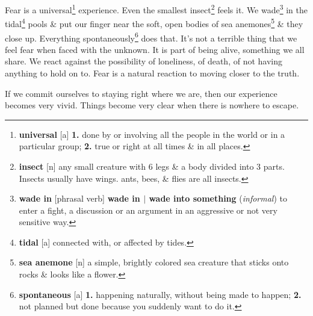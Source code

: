 \documentclass[oneside]{book}
\numberwithin{equation}{section}
\begin{document}
Fear is a universal\footnote{\textbf{universal} [a] \textbf{1.} done by or involving all the people in the world or in a particular group; \textbf{2.} true or right at all times \& in all places.} experience. Even the smallest insect\footnote{\textbf{insect} [n] any small creature with 6 legs \& a body divided into 3 parts. Insects usually have wings. ants, bees, \& flies are all insects.} feels it. We wade\footnote{\textbf{wade in} [phrasal verb] \textbf{wade in $|$ wade into something} (\textit{informal}) to enter a fight, a discussion or an argument in an aggressive or not very sensitive way.} in the tidal\footnote{\textbf{tidal} [a] connected with, or affected by tides.} pools \& put our finger near the soft, open bodies of sea anemones\footnote{\textbf{sea anemone} [n] a simple, brightly colored sea creature that sticks onto rocks \& looks like a flower.} \& they close up. Everything spontaneously\footnote{\textbf{spontaneous} [a] \textbf{1.} happening naturally, without being made to happen; \textbf{2.} not planned but done because you suddenly want to do it.} does that. It's not a terrible thing that we feel fear when faced with the unknown. It is part of being alive, something we all share. We react against the possibility of loneliness, of death, of not having anything to hold on to. Fear is a natural reaction to moving closer to the truth.

If we commit ourselves to staying right where we are, then our experience becomes very vivid. Things become very clear when there is nowhere to escape.
\end{document}
